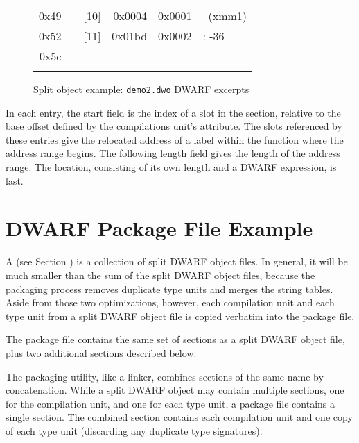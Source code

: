 \begin{figure}[ht]
\begin{dwflisting}
\begin{center}
\begin{tabular}{rl|rr|rl}
0x49 & \XXLLEsl & [10] & 0x0004 & 0x0001 & \DWOPregeighteen~(xmm1) \\
0x52 & \XXLLEsl & [11] & 0x01bd & 0x0002 & \DWOPfbreg: -36 \\
0x5c & \XXLLEeol &&&& \\
&&&& \\
\end{tabular}
\end{center}
\end{dwflisting}
\caption{Split object example: \texttt{demo2.dwo} DWARF \dotdebugloclistsdwo{} excerpts}
\label{fig:splitobjectexampledemotwodwodwarfdebuglocdwoexcerpts}
\end{figure}

\bb
In each \DWLLEstartlength{} entry, 
\eb
the start field is the index
of a slot in the \dotdebugaddr{} section, relative to the base
offset defined by the compilations unit's \DWATaddrbase{}
attribute. The \dotdebugaddr{} slots referenced by these entries give
the relocated address of a label within the function where the
address range begins. 
The following length field gives the length of the
address range. The location, consisting of its own length and
a DWARF expression, is last.

\clearpage
\section{DWARF Package File Example}
\label{app:dwarfpackagefileexample}

A  
(see Section ) 
is a collection of split DWARF object files.
In general, it will be much smaller than the sum of the split
DWARF object files, because the packaging process removes duplicate
type units and merges the string tables. Aside from those two
optimizations, however, each compilation unit and each type unit
from a split DWARF object file is copied verbatim into the package
file.

The package file contains the same set of sections as a split
DWARF object file, plus two additional sections described below.

The packaging utility, like a linker, combines sections of the
same name by concatenation. While a split DWARF object may
contain multiple \dotdebuginfodwo{} sections, one for the
compilation unit, and one for each type unit, a package file
contains a single \dotdebuginfodwo{} section. The combined
\dotdebuginfodwo{} section contains each compilation unit and one
copy of each type unit (discarding any duplicate type
signatures).


